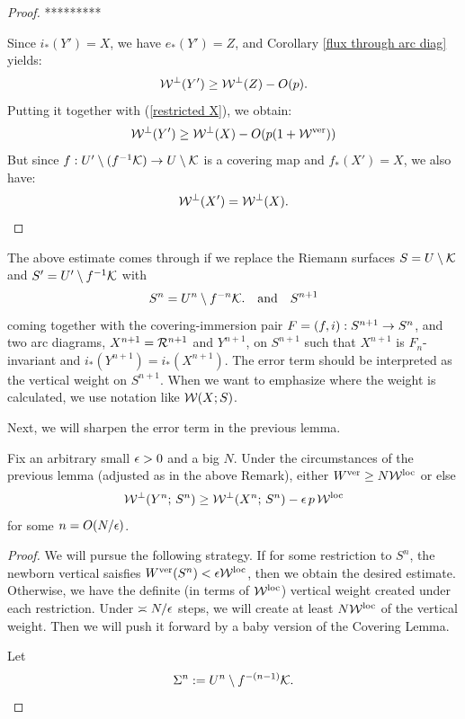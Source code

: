 {{\begin{proof}
{%
*********}

Since $i_*(Y') =X$, we have $e_*(Y') = Z$, and Corollary 
\ref{flux through arc diag} yields: 
$$
   {\mathcal W}^\perp (Y') \geq {\mathcal W}^\perp (Z) - O(p).
$$
Putting it together with (\ref{restricted X}), we obtain: 
$$
      {\mathcal W}^\perp (Y') \geq {\mathcal W}^\perp (X) - O(p(1+  {\mathcal W}^{\mathrm {ver}})) 
$$
But since $f: U' \setminus (f^{-1}{\mathcal K})\rightarrow U\setminus {\mathcal K}$ is a covering map and
$f_* (X')= X$, 
we also have:
$${\mathcal W}^\perp (X') = {\mathcal W}^\perp (X).$$ 
\end{proof}
   
\begin{rem}\label{refinement}
The above estimate comes through if we replace the Riemann surfaces
$S=U\setminus {\mathcal K}$ and $S'= U'\setminus f^{-1} {\mathcal K}$ with 
$$
    S^n  = U^n\setminus f^{-n} {\mathcal K}. \quad \mathrm{and} \quad   S^{n+1}   
$$
coming together
with the  covering-immersion pair $F =(f ,i) : S^{n+1} \rightarrow S^n$, 
and two   arc diagrams,  $X^{n+1} ={\mathcal R}^{n+1} $ and $Y^{n+1}$,  on $S^{n+1}$ 
such that $X^{n+1} $ is $F_n$-invariant and  $i_ * (Y^{n+1} ) = i_*(X^{n+1})$.   
The error term should be interpreted as the vertical weight on $S^{n+1}$. 
When we want to emphasize  where the weight is calculated, 
we use notation like ${\mathcal W}(X; S)$. 
\end{rem}

Next, we will sharpen the error term in  the previous lemma. 


\begin{lem}\label{flux through inv WAD-improved}
Fix an arbitrary small ${\epsilon}>0$ and a big $N$. 
Under the circumstances of the previous lemma
(adjusted as in the above Remark), 
either $W^{\mathrm {ver}} \geq N {\mathcal W}^{\mathrm{loc}}$
or else
$$
  {\mathcal W}^\perp (Y^n;\, S^n  )\geq 
{\mathcal W}^\perp (X^n; \,    S^n) - {\epsilon}\, p\, {\mathcal W}^{\mathrm{loc}}  
$$ 
for some $n = O( N/{\epsilon}) $. 
\end{lem}  

\begin{proof}
We will pursue the following strategy. 
  If for some restriction to  $S^n$, 
the newborn vertical saisfies $W^{\mathrm {ver}} (S^n) < {\epsilon} {\mathcal W}^{\mathrm{loc}}$, 
then we obtain the desired estimate. Otherwise, we have the
definite (in terms of ${\mathcal W}^{\mathrm{loc}}$) vertical weight created under each restriction. 
Under $\asymp N/{\epsilon}$ steps, we will create at least $N{\mathcal W}^{\mathrm{loc}}$ of
the vertical weight.
Then we will push it forward by a baby version of the Covering Lemma. 


Let  
$$
{\Sigma}^n : = U^n \setminus f^{-(n-1) } {\mathcal K}.
$$


\end{proof}}}
